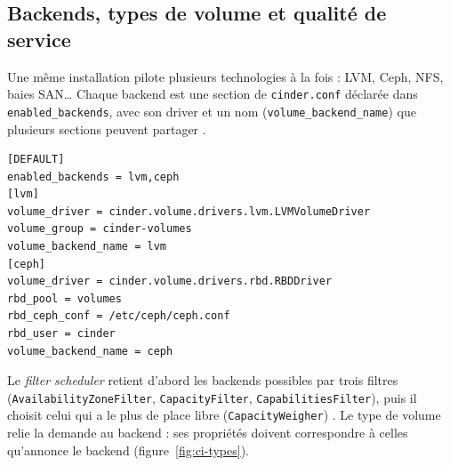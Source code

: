 \subsection{Backends, types de volume et qualité de service}\label{sec:ci-types}

Une même installation pilote plusieurs technologies à la fois : LVM, Ceph, NFS, baies SAN\dots{} Chaque backend est
une section de \texttt{cinder.conf} déclarée dans \texttt{enabled\_\allowbreak backends}, avec son driver et un nom
(\texttt{volume\_\allowbreak backend\_\allowbreak name}) que plusieurs sections peuvent partager
\parencite{cinder-multibackend, cinder-drivers}.

\par\noindent\begin{minipage}{\linewidth}
\begin{lstlisting}
[DEFAULT]
enabled_backends = lvm,ceph
[lvm]
volume_driver = cinder.volume.drivers.lvm.LVMVolumeDriver
volume_group = cinder-volumes
volume_backend_name = lvm
[ceph]
volume_driver = cinder.volume.drivers.rbd.RBDDriver
rbd_pool = volumes
rbd_ceph_conf = /etc/ceph/ceph.conf
rbd_user = cinder
volume_backend_name = ceph
\end{lstlisting}
\end{minipage}\par

Le \emph{filter scheduler} retient d'abord les backends possibles par trois filtres (\texttt{AvailabilityZoneFilter},
\texttt{CapacityFilter}, \texttt{CapabilitiesFilter}), puis il choisit celui qui a le plus de place libre
(\texttt{CapacityWeigher}) \parencite{cinder-multibackend}. Le type de volume relie la demande au backend :
ses propriétés doivent correspondre à celles qu'annonce le backend (figure~\ref{fig:ci-types}).

